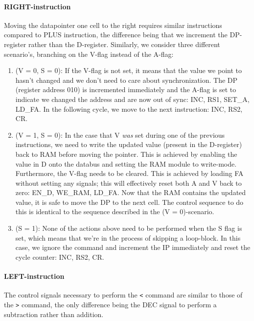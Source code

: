 \documentclass{article}
\begin{document}
\paragraph{RIGHT-instruction} Moving the datapointer one cell to the right requires similar instructions compared to PLUS instruction, the difference being that we increment the DP-register rather than the D-register. Similarly, we consider three different scenario's, branching on the V-flag instead of the A-flag:
%
\begin{enumerate}
\item (V = 0, S = 0): If the V-flag is not set, it means that the value we point to hasn't changed and we don't need to care about synchronization. The DP (register address 010) is incremented immediately and the A-flag is set to indicate we changed the address and are now out of sync: INC, RS1, SET\_A, LD\_FA. In the following cycle, we move to the next instruction: INC, RS2, CR.
\item (V = 1, S = 0): In the case that V \emph{was} set during one of the previous instructions, we need to write the updated value (present in the D-register) back to RAM before moving the pointer. This is achieved by enabling the value in D onto the databus and setting the RAM module to write-mode. Furthermore, the V-flag needs to be cleared. This is achieved by loading FA without setting any signals; this will effectively reset both A and V back to zero: EN\_D, WE\_RAM, LD\_FA. Now that the RAM contains the updated value, it is safe to move the DP to the next cell. The control sequence to do this is identical to the sequence described in the (V = 0)-scenario.
\item (S = 1): None of the actions above need to be performed when the S flag is set, which means that we're in the process of skipping a loop-block. In this case, we ignore the command and increment the IP immediately and reset the cycle counter: INC, RS2, CR.
\end{enumerate}

\paragraph{LEFT-instruction} The control signals necessary to perform the \texttt{<} command are similar to those of the \texttt{>} command, the only difference being the DEC signal to perform a subtraction rather than addition.
\end{document}
